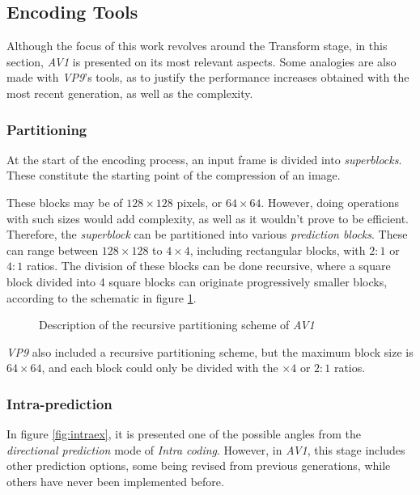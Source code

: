 \subsection{Encoding Tools}

\nocite{chenOverviewCoreCoding2018}

Although the focus of this work revolves around the Transform stage, in this section, \emph{AV1} is presented on its most relevant aspects. Some analogies are also made with \emph{VP9}'s tools, as to justify the performance increases obtained with the most recent generation, as well as the complexity.

\subsubsection{Partitioning}

At the start of the encoding process, an input frame is divided into \emph{superblocks}. These constitute the starting point of the compression of an image.

These blocks may be of $128 \times 128$ pixels, or $64 \times 64$. However, doing operations with such sizes would add complexity, as well as it wouldn't prove to be efficient. Therefore, the \emph{superblock} can be partitioned into various \emph{prediction blocks}. These can range between $128 \times 128$ to $4 \times 4$, including rectangular blocks, with $2:1$ or $4:1$ ratios. The division of these blocks can be done recursive, where a square block divided into 4 square blocks can originate progressively smaller blocks, according to the schematic in figure \ref{fig:partitioning}.

\begin{figure}[!htbp]
    \centering
    
    \caption{Description of the recursive partitioning scheme of \emph{AV1}} 
    \label{fig:partitioning}
\end{figure}

\emph{VP9} also included a recursive partitioning scheme, but the maximum block size is $64 \times 64$, and each block could only be divided with the $\times 4$ or $2:1$ ratios.

\subsubsection{Intra-prediction}

In figure \ref{fig:intraex}, it is presented one of the possible angles from the \emph{directional prediction} mode of \emph{Intra coding}. However, in \emph{AV1}, this stage includes other prediction options, some being revised from previous generations, while others have never been implemented before.

